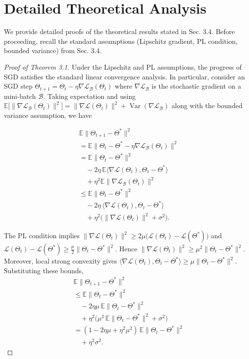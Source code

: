 \documentclass[letterpaper]{article} %
\theoremstyle{definition}                %
\theoremstyle{plain}                     %
\theoremstyle{remark}                    %
\DeclareMathOperator{\Var}{Var}
\begin{document}
\section{Detailed Theoretical Analysis}
\label{subsec: Theoretical Supp}
We provide detailed proofs of the theoretical results stated in Sec. 3.4. Before proceeding, recall the standard assumptions (Lipschitz gradient, PL condition, bounded variance) from Sec. 3.4.

\begin{proof}[Proof of Theorem 3.1]
Under the Lipschitz and PL assumptions, the progress of SGD satisfies the standard linear convergence analysis. In particular, consider an SGD step $\Theta_{t+1}=\Theta_t - \eta\nabla\mathcal{L}_{\mathcal{B}}(\Theta_t)$ where $\nabla\mathcal{L}_{\mathcal{B}}$ is the stochastic gradient on a mini-batch $\mathcal{B}$.  Taking expectation and using 
$\mathbb{E}\bigl[\|\nabla \mathcal{L}_{\mathcal{B}}(\Theta_t)\|^2\bigr] = \|\nabla \mathcal{L}(\Theta_t)\|^2 + \Var(\nabla \mathcal{L}_{\mathcal{B}})$ 
along with the bounded variance assumption, we have


\[
\begin{alignedat}{1}
&\mathbb{E}\|\Theta_{t+1}-\Theta^*\|^2 \\[2pt]
&= \mathbb{E}\bigl\|\Theta_t-\Theta^*-\eta\nabla\mathcal{L}_{\mathcal{B}}(\Theta_t)\bigr\|^2 \\[2pt]
&= \mathbb{E}\|\Theta_t-\Theta^*\|^2 \\ 
&\quad - 2\eta\,\mathbb{E}\langle\nabla\mathcal{L}(\Theta_t),\Theta_t-\Theta^*\rangle \\ 
&\quad + \eta^2\mathbb{E}\|\nabla\mathcal{L}_{\mathcal{B}}(\Theta_t)\|^2 \\[2pt]
&\le \mathbb{E}\|\Theta_t-\Theta^*\|^2 \\ 
&\quad - 2\eta\,\langle\nabla\mathcal{L}(\Theta_t),\Theta_t-\Theta^*\rangle \\ 
&\quad + \eta^2\bigl(\|\nabla\mathcal{L}(\Theta_t)\|^2 + \sigma^2\bigr).
\end{alignedat}
\]




The PL condition implies $\|\nabla\mathcal{L}(\Theta_t)\|^2\ge 2\mu\bigl(\mathcal{L}(\Theta_t)-\mathcal{L}(\Theta^*)\bigr)$ and 
$\mathcal{L}(\Theta_t)-\mathcal{L}(\Theta^*) \ge \tfrac{\mu}{2}\|\Theta_t-\Theta^*\|^2$. Hence 
$\|\nabla\mathcal{L}(\Theta_t)\|^2 \ge \mu^2\|\Theta_t-\Theta^*\|^2$.  Moreover, local strong convexity gives 
$\langle \nabla\mathcal{L}(\Theta_t), \Theta_t-\Theta^*\rangle \ge \mu \|\Theta_t-\Theta^*\|^2$.  Substituting these bounds,
\[
\begin{alignedat}{1}
&\mathbb{E}\|\Theta_{t+1}-\Theta^*\|^2 \\[2pt]
&\le \mathbb{E}\|\Theta_t-\Theta^*\|^2 \\ 
&\quad - 2\eta\mu\,\mathbb{E}\|\Theta_t-\Theta^*\|^2 \\ 
&\quad + \eta^2\bigl(\mu^2\,\mathbb{E}\|\Theta_t-\Theta^*\|^2 + \sigma^2\bigr) \\[2pt]
&= (1 - 2\eta\mu + \eta^2\mu^2)\,\mathbb{E}\|\Theta_t-\Theta^*\|^2 \\ 
&\quad + \eta^2\sigma^2.
\end{alignedat}
\]



\end{proof}
\end{document}
